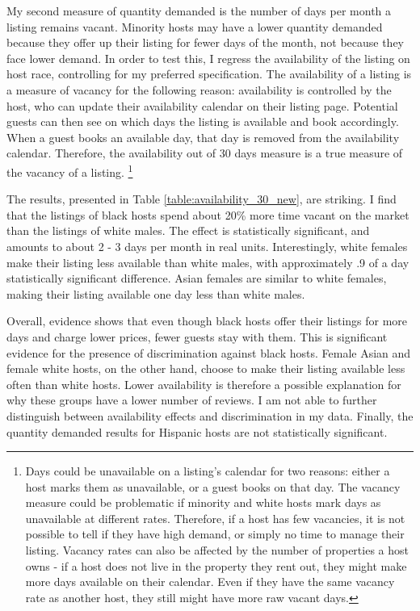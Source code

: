 
My second measure of quantity demanded is the number of days per month a listing remains vacant. Minority hosts may have a lower quantity demanded because they offer up their listing for fewer days of the month, not because they face lower demand. In order to test this, I regress the availability of the listing on host race, controlling for my preferred specification. The availability of a listing is a measure of vacancy for the following reason: availability is controlled by the host, who can update their availability calendar on their listing page. Potential guests can then see on which days the listing is available and book accordingly. When a guest books an available day, that day is removed from the availability calendar. Therefore, the availability out of 30 days measure is a true measure of the vacancy of a listing.%
	\footnote{Days could be unavailable on a listing's calendar for two reasons: either a host marks them as unavailable, or a guest books on that day. The vacancy measure could be problematic if minority and white hosts mark days as unavailable at different rates. Therefore, if a host has few vacancies, it is not possible to tell if they have high demand, or simply no time to manage their listing. Vacancy rates can also be affected by the number of properties a host owns - if a host does not live in the property they rent out, they might make more days available on their calendar. Even if they have the same vacancy rate as another host, they still might have more raw vacant days.}

The results, presented in Table \ref{table:availability_30_new}, are striking. I find that the listings of black hosts spend about 20\% more time vacant on the market than the listings of white males. The effect is statistically significant, and amounts to about 2 - 3 days per month in real units. Interestingly, white females make their listing less available than white males, with approximately .9 of a day statistically significant difference. Asian females are similar to white females, making their listing available one day less than white males. 

Overall, evidence shows that even though black hosts offer their listings for more days and charge lower prices, fewer guests stay with them. This is significant evidence for the presence of discrimination against black hosts. Female Asian and female white hosts, on the other hand, choose to make their listing available less often than white hosts. Lower availability is therefore a possible explanation for why these groups have a lower number of reviews. I am not able to further distinguish between availability effects and discrimination in my data. Finally, the quantity demanded results for Hispanic hosts are not statistically significant. 


